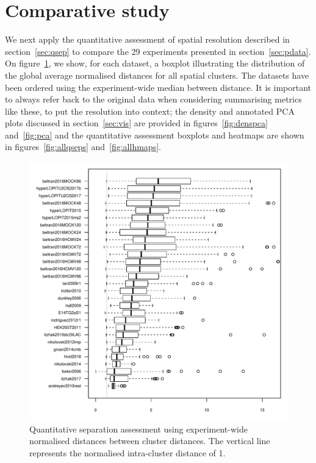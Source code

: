 \documentclass[12pt]{article}\usepackage[]{graphicx}\usepackage[]{color}
\newenvironment{knitrout}{}{} %
\begin{document}
\clearpage

\section{Comparative study}\label{sec:compara}

We next apply the quantitative assessment of spatial resolution
described in section~\ref{sec:qsep} to compare the 29
experiments presented in section~\ref{sec:pdata}. On
figure~\ref{fig:qsep}, we show, for each dataset, a boxplot
illustrating the distribution of the global average normalised
distances for all spatial clusters. The datasets have been ordered
using the experiment-wide median between distance. It is important to
always refer back to the original data when considering
summarising metrics like these, to put the resolution into context;
the density and annotated PCA plots discussed in section~\ref{sec:vis}
are provided in figures~\ref{fig:denspca} and~\ref{fig:pca} and the
quantitative assessment boxplots and heatmaps are shown in
figures~\ref{fig:allqseps} and~\ref{fig:allhmaps}.



\begin{figure}[ht]
  \centering
\begin{knitrout}
\color{fgcolor}
\includegraphics[width=0.65\linewidth]{figure/figqsep-1} 

\end{knitrout}
\caption{Quantitative separation assessment using experiment-wide
  normalised distances between cluster distances. The vertical line
  represents the normalised intra-cluster distance of 1.}
  \label{fig:qsep}
\end{figure}
\end{document}
